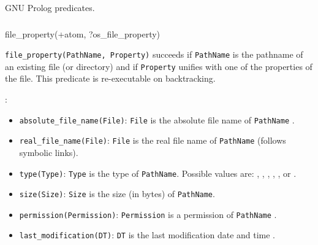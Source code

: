 \Portability

GNU Prolog predicates.

\subsubsection{\label{file-property/2}}

\begin{TemplatesOneCol}
file\_property(+atom, ?os\_file\_property)

\end{TemplatesOneCol}

\Description

\texttt{file\_property(PathName, Property)} succeeds if \texttt{PathName} is
the pathname of an existing file (or directory) and if \texttt{Property}
unifies with one of the properties of the file. This predicate is
re-executable on backtracking.

:

\begin{itemize}

\item {}\texttt{absolute\_file\_name(File)}:
\texttt{File} is the absolute file name of \texttt{PathName}
.

\item {}\texttt{real\_file\_name(File)}: \texttt{File} is
the real file name of \texttt{PathName} (follows symbolic links).

\item {}\texttt{type(Type)}: \texttt{Type} is the type of
  \texttt{PathName}. Possible values are: ,
  , , ,
,  or .

\item {}\texttt{size(Size)}: \texttt{Size} is the size (in bytes) of
\texttt{PathName}.

\item {}\texttt{permission(Permission)}: \texttt{Permission} is a
permission of \texttt{PathName} .

\item {}\texttt{last\_modification(DT)}: \texttt{DT} is
the last modification date and time .

\end{itemize}


